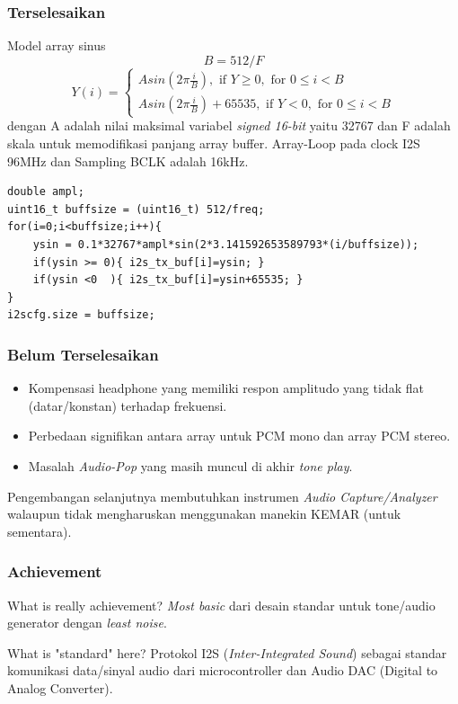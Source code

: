\documentclass[table,dvipsnames,10pt]{beamer}
\begin{document}
	\begin{frame}[fragile]
	\frametitle{Terselesaikan}
	\begin{exampleblock}{Model array sinus}
		\[ B = 512/F \]
		\[
		Y(i) =
		\begin{cases}
		A sin(2 \pi \frac{i}{B}), \text{ if } Y \geq 0, \text{ for } 0 \leq i < B\\
		A sin(2 \pi \frac{i}{B})+65535, \text{ if } Y < 0, \text{ for } 0 \leq i < B
		\end{cases}
		\]
		dengan A adalah nilai maksimal variabel \textit{signed 16-bit} yaitu 32767
		dan F adalah skala untuk memodifikasi panjang array buffer.
		Array-Loop pada clock I2S 96MHz dan Sampling BCLK adalah 16kHz.
	\end{exampleblock}
	\begin{exampleblock}{}
		\begin{verbatim}
double ampl;
uint16_t buffsize = (uint16_t) 512/freq;
for(i=0;i<buffsize;i++){
	ysin = 0.1*32767*ampl*sin(2*3.141592653589793*(i/buffsize));
	if(ysin >= 0){ i2s_tx_buf[i]=ysin; }
	if(ysin <0  ){ i2s_tx_buf[i]=ysin+65535; }
}
i2scfg.size = buffsize;
		\end{verbatim}
	\end{exampleblock}
	\end{frame}

	\begin{frame}[fragile]
	\frametitle{Belum Terselesaikan}
	\begin{exampleblock}{}
		\begin{itemize}
			\item Kompensasi headphone yang memiliki respon amplitudo yang
			tidak flat (datar/konstan) terhadap frekuensi.
			
			\item Perbedaan signifikan antara array untuk PCM mono dan array PCM stereo.
			
			\item Masalah \textit{Audio-Pop} yang masih muncul di akhir \textit{tone play}.
		\end{itemize}
	\end{exampleblock}
	\begin{exampleblock}{}
		Pengembangan selanjutnya membutuhkan instrumen \textit{Audio Capture/Analyzer}
		walaupun tidak mengharuskan menggunakan manekin KEMAR (untuk sementara).
	\end{exampleblock}
	\end{frame}

	\begin{frame}
	\frametitle{Achievement}
	\begin{exampleblock}{What is really achievement?}
		\textit{Most basic} dari desain standar untuk tone/audio generator dengan \textit{least noise}.
	\end{exampleblock}
	\begin{exampleblock}{What is "standard" here?}
		Protokol I2S (\textit{Inter-Integrated Sound}) sebagai standar komunikasi data/sinyal audio
		dari microcontroller dan Audio DAC (Digital to Analog Converter). 
	\end{exampleblock}
	\end{frame}
\end{document}
